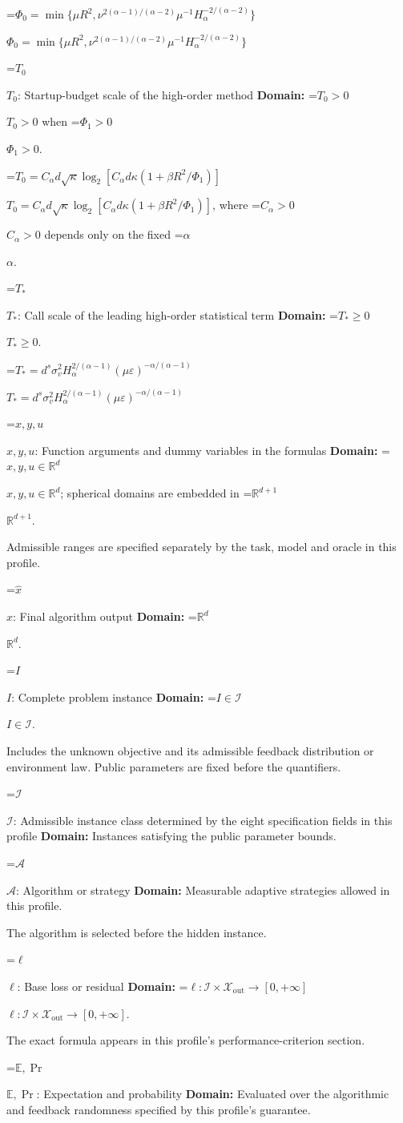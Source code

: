 \documentclass[10pt,a4paper]{article}
\newcommand{\AtlasMath}[1]{\par\begingroup\centering\setbox0=\hbox{$\displaystyle #1$}\ifdim\wd0>1.4\linewidth\typeout{ATLAS WIDE FORMULA: \the\wd0}\fi\ifdim\wd0>\linewidth\resizebox{\linewidth}{!}{\box0}\else\box0\fi\par\endgroup}
\newcommand{\AtlasInlineMath}[1]{\begingroup\setbox0=\hbox{$#1$}\ifdim\wd0>.4\linewidth\endgroup\AtlasMath{#1}\else\endgroup$#1$\fi}
\begin{document}
\AtlasInlineMath{\Phi_0=\min\{\mu R^2,\nu^{2(\alpha-1)/(\alpha-2)}\mu^{-1}H_\alpha^{-2/(\alpha-2)}\}}

\AtlasInlineMath{T_0}: Startup-budget scale of the high-order method \textbf{Domain:} \AtlasInlineMath{T_0>0} when \AtlasInlineMath{\Phi_1>0}.

\AtlasInlineMath{T_0=C_\alpha d\sqrt\kappa\log_2[C_\alpha d\kappa(1+\beta R^2/\Phi_1)]}, where \AtlasInlineMath{C_\alpha>0} depends only on the fixed \AtlasInlineMath{\alpha}.

\AtlasInlineMath{T_*}: Call scale of the leading high-order statistical term \textbf{Domain:} \AtlasInlineMath{T_*\ge0}.

\AtlasInlineMath{T_*=d^s\sigma_v^2H_\alpha^{2/(\alpha-1)}(\mu\varepsilon)^{-\alpha/(\alpha-1)}}

\AtlasInlineMath{x,y,u}: Function arguments and dummy variables in the formulas \textbf{Domain:} \AtlasInlineMath{x,y,u\in\mathbb{R}^d}; spherical domains are embedded in \AtlasInlineMath{\mathbb{R}^{d+1}}.

Admissible ranges are specified separately by the task, model and oracle in this profile.

\AtlasInlineMath{\widehat{x}}: Final algorithm output \textbf{Domain:} \AtlasInlineMath{\mathbb{R}^d}.

\AtlasInlineMath{I}: Complete problem instance \textbf{Domain:} \AtlasInlineMath{I\in\mathcal{I}}.

Includes the unknown objective and its admissible feedback distribution or environment law. Public parameters are fixed before the quantifiers.

\AtlasInlineMath{\mathcal{I}}: Admissible instance class determined by the eight specification fields in this profile \textbf{Domain:} Instances satisfying the public parameter bounds.

\AtlasInlineMath{\mathcal{A}}: Algorithm or strategy \textbf{Domain:} Measurable adaptive strategies allowed in this profile.

The algorithm is selected before the hidden instance.

\AtlasInlineMath{\ell}: Base loss or residual \textbf{Domain:} \AtlasInlineMath{\ell:\mathcal{I}\times\mathcal{X}_{\mathrm{out}}\to[0,+\infty]}.

The exact formula appears in this profile's performance-criterion section.

\AtlasInlineMath{\mathbb{E},\Pr}: Expectation and probability \textbf{Domain:} Evaluated over the algorithmic and feedback randomness specified by this profile's guarantee.
\end{document}
